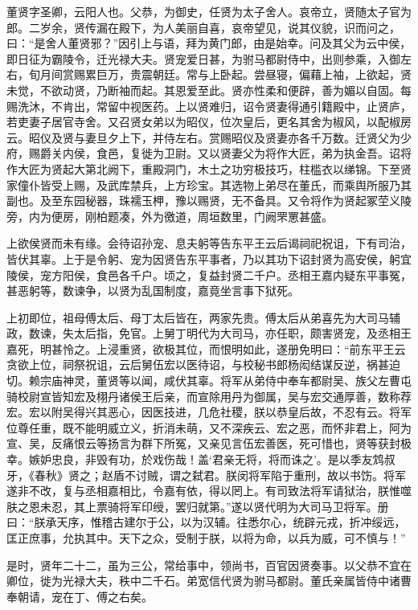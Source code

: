 \documentclass[12pt,UTF8]{ctexbook}
\begin{document}
董贤字圣卿，云阳人也。父恭，为御史，任贤为太子舍人。哀帝立，贤随太子官为郎。二岁余，贤传漏在殿下，为人美丽自喜，哀帝望见，说其仪貌，识而问之，曰：“是舍人董贤邪？”因引上与语，拜为黄门郎，由是始幸。问及其父为云中侯，即日征为霸陵令，迁光禄大夫。贤宠爱日甚，为驸马都尉侍中，出则参乘，入御左右，旬月间赏赐累巨万，贵震朝廷。常与上卧起。尝昼寝，偏藉上袖，上欲起，贤未觉，不欲动贤，乃断袖而起。其恩爱至此。贤亦性柔和便辟，善为媚以自固。每赐洗沐，不肯出，常留中视医药。上以贤难归，诏令贤妻得通引籍殿中，止贤庐，若吏妻子居官寺舍。又召贤女弟以为昭仪，位次皇后，更名其舍为椒风，以配椒房云。昭仪及贤与妻旦夕上下，并侍左右。赏赐昭仪及贤妻亦各千万数。迁贤父为少府，赐爵关内侯，食邑，复徙为卫尉。又以贤妻父为将作大匠，弟为执金吾。诏将作大匠为贤起大第北阙下，重殿洞门，木土之功穷极技巧，柱槛衣以绨锦。下至贤家僮仆皆受上赐，及武库禁兵，上方珍宝。其选物上弟尽在董氏，而乘舆所服乃其副也。及至东园秘器，珠襦玉柙，豫以赐贤，无不备具。又令将作为贤起冢茔义陵旁，内为便房，刚柏题凑，外为徼道，周垣数里，门阙罘罳甚盛。



上欲侯贤而未有缘。会待诏孙宠、息夫躬等告东平王云后谒祠祀祝诅，下有司治，皆伏其辜。上于是令躬、宠为因贤告东平事者，乃以其功下诏封贤为高安侯，躬宜陵侯，宠方阳侯，食邑各千户。顷之，复益封贤二千户。丞相王嘉内疑东平事冤，甚恶躬等，数谏争，以贤为乱国制度，嘉竟坐言事下狱死。



上初即位，祖母傅太后、母丁太后皆在，两家先贵。傅太后从弟喜先为大司马辅政，数谏，失太后指，免官。上舅丁明代为大司马，亦任职，颇害贤宠，及丞相王嘉死，明甚怜之。上浸重贤，欲极其位，而恨明如此，遂册免明曰：“前东平王云贪欲上位，祠祭祝诅，云后舅伍宏以医待诏，与校秘书郎杨闳结谋反逆，祸甚迫切。赖宗庙神灵，董贤等以闻，咸伏其辜。将军从弟侍中奉车都尉吴、族父左曹屯骑校尉宣皆知宏及栩丹诸侯王后亲，而宣除用丹为御属，吴与宏交通厚善，数称荐宏。宏以附吴得兴其恶心，因医技进，几危社稷，朕以恭皇后故，不忍有云。将军位尊任重，既不能明威立义，折消未萌，又不深疾云、宏之恶，而怀非君上，阿为宣、吴，反痛恨云等扬言为群下所冤，又亲见言伍宏善医，死可惜也，贤等获封极幸。嫉妒忠良，非毁有功，於戏伤哉！盖‘君亲无将，将而诛之’。是以季友鸩叔牙，《春秋》贤之；赵盾不讨贼，谓之弑君。朕闵将军陷于重刑，故以书饬。将军遂非不改，复与丞相嘉相比，令嘉有依，得以罔上。有司致法将军请狱治，朕惟噬肤之恩未忍，其上票骑将军印绶，罢归就第。”遂以贤代明为大司马卫将军。册曰：“朕承天序，惟稽古建尔于公，以为汉辅。往悉尔心，统辟元戎，折冲绥远，匡正庶事，允执其中。天下之众，受制于朕，以将为命，以兵为威，可不慎与！”



是时，贤年二十二，虽为三公，常给事中，领尚书，百官因贤奏事。以父恭不宜在卿位，徙为光禄大夫，秩中二千石。弟宽信代贤为驸马都尉。董氏亲属皆侍中诸曹奉朝请，宠在丁、傅之右矣。
\end{document}
